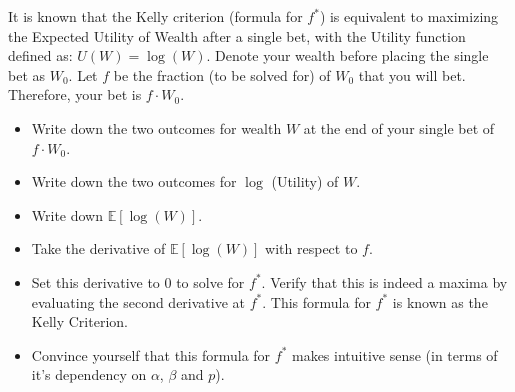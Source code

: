 \documentclass[12pt]{exam}
\begin{document}
\begin{questions}
It is known that the Kelly criterion (formula for $f^*$) is equivalent to maximizing the Expected Utility of Wealth after a single bet, with the Utility function defined as: $U(W) = \log(W)$. Denote your wealth before placing the single bet as $W_0$. Let $f$ be the fraction (to be solved for) of $W_0$ that you will bet. Therefore, your bet is $f \cdot W_0$.

\begin{itemize}
\item Write down the two outcomes for wealth $W$ at the end of your single bet of $f \cdot W_0$.
\item Write down the two outcomes for $\log$ (Utility) of $W$.
\item Write down $\mathbb{E}[\log(W)]$.
\item Take the derivative of $\mathbb{E}[\log(W)]$ with respect to $f$. 
\item Set this derivative to 0 to solve for $f^*$. Verify that this is indeed a maxima by evaluating the second derivative at $f^*$. This formula for $f^*$ is known as the Kelly Criterion. 
\item Convince yourself that this formula for $f^*$ makes intuitive sense (in terms of it's dependency on $\alpha$, $\beta$ and $p$).
\end{itemize}

\end{questions}
\end{document}
